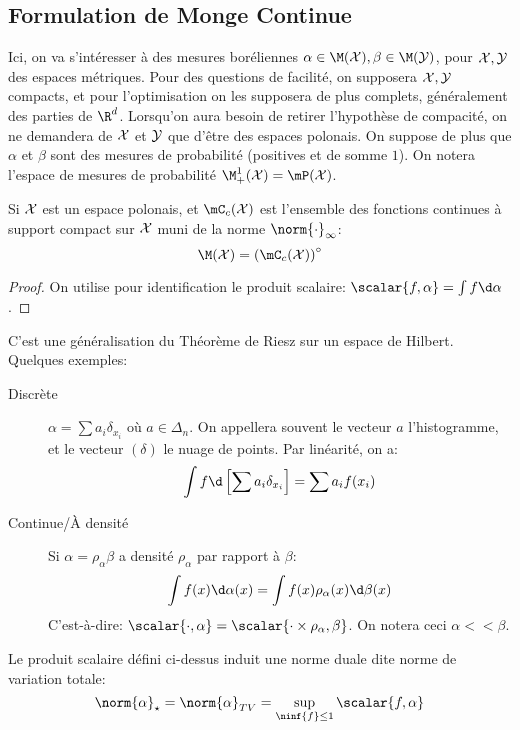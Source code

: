 \subsection{Formulation de Monge Continue}
Ici, on va s'intéresser à des mesures boréliennes $\alpha \in \M(\X), \beta \in \M(\Y)$,
pour $\mathcal{X}, \mathcal{Y}$ des espaces métriques.
Pour des questions de facilité, on supposera $\mathcal{X}, \mathcal{Y}$ compacts, et pour l'optimisation on les supposera
de plus complets, généralement des parties de $\R^{d}$.
Lorsqu'on aura besoin de retirer l'hypothèse de compacité, on ne demandera de $\mathcal{X}$ et $\mathcal{Y}$
que d'être des espaces polonais.
On suppose de plus que $\alpha$ et $\beta$ sont des mesures de probabilité (positives et de somme $1$).
On notera l'espace de mesures de probabilité $\M_{+}^{1}(\X) = \mP(\X)$.
\begin{thm}
	Si $\mathcal{X}$ est un espace polonais, et $\mC_{c}(\X)$ est l'ensemble des fonctions continues à support compact sur $\mathcal{X}$ muni de la norme $\norm{\cdot}_{\infty}$:
	\begin{equation*}
		\M(\X) = \left(\mC_{c}(\X)\right)^{\circ}
	\end{equation*}
\end{thm}
\begin{proof}
	On utilise pour identification le produit scalaire: $\scalar{f, \alpha} = \int f \d\alpha$.
\end{proof}
C'est une généralisation du Théorème de Riesz sur un espace de Hilbert.
Quelques exemples:
\begin{description}
	\item[Discrète] $\alpha = \sum a_{i}\delta_{x_{i}}$ où $a \in \Delta_{n}$.
	      On appellera souvent le vecteur $a$ l'histogramme, et le vecteur $(\delta)$ le nuage de points.
	      Par linéarité, on a:
	      \begin{equation*}
		      \int f\d\left[\sum a_{i}\delta_{x_{i}}\right] = \sum a_{i}f(x_{i})
	      \end{equation*}
	\item[Continue/À densité] Si $\alpha = \rho_{\alpha}\beta$ a densité $\rho_{\alpha}$ par rapport à $\beta$:
	      \begin{equation*}
		      \int f(x)\d\alpha(x) = \int f(x) \rho_{\alpha}(x)\d\beta(x)
	      \end{equation*}
	      C'est-à-dire: $\scalar{\cdot, \alpha} = \scalar{\cdot \times \rho_{\alpha}, \beta}$. On notera ceci $\alpha << \beta$.
\end{description}

Le produit scalaire défini ci-dessus induit une norme duale dite norme de variation totale:
\begin{equation*}
	\norm{\alpha}_{\star} = \norm{\alpha}_{TV} = \sup_{\ninf{f} \leq 1}\scalar{f, \alpha}
\end{equation*}


